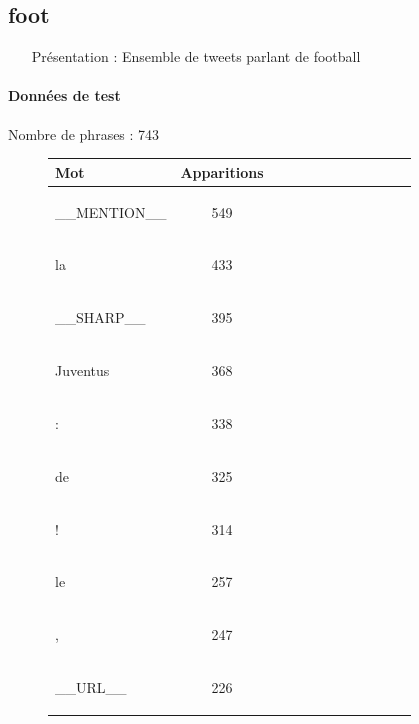 \subsection{foot } 
 \begin{itemize} 
 \item[Présentation :] Ensemble de tweets parlant de football

 \end{itemize}  \paragraph{Données de test \\ }  
 Nombre de phrases : 743\\ 
\begin{figure}[H] \begin{minipage}{0.48\textwidth} \centering \begin{tabular}{|l || *{11 }{|c} |} \hline
Mot & Apparitions  \\ \hline
\begin{verb} __MENTION__ \end{verb} &549\\ \hline
\begin{verb} la \end{verb} &433\\ \hline
\begin{verb} __SHARP__ \end{verb} &395\\ \hline
\begin{verb} Juventus \end{verb} &368\\ \hline
\begin{verb} : \end{verb} &338\\ \hline
\begin{verb} de \end{verb} &325\\ \hline
\begin{verb} ! \end{verb} &314\\ \hline
\begin{verb} le \end{verb} &257\\ \hline
\begin{verb} , \end{verb} &247\\ \hline
\begin{verb} __URL__ \end{verb} &226\\ \hline


\end{tabular}
\end{minipage}
\end{figure}
